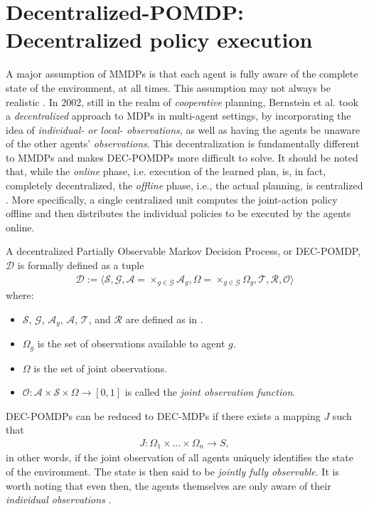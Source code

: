 \section{Decentralized-POMDP: Decentralized policy execution}
\label{sec:decpomdp}
A major assumption of MMDPs is that each agent is fully aware of the complete state of the environment, at all times. This assumption may not always be realistic \cite{decmdp}. In 2002, still in the realm of \textit{cooperative} planning, Bernstein et al. \cite{decmdp2} took a \textit{decentralized} approach to MDPs in multi-agent settings, by incorporating the idea of \textit{individual- or local- observations}, as well as having the agents be unaware of the other agents' \textit{observations}. This decentralization is fundamentally different to MMDPs and makes DEC-POMDPs more difficult to solve. It should be noted that, while the \textit{online} phase, i.e. execution of the learned plan, is, in fact, completely decentralized, the \textit{offline} phase, i.e., the actual planning, is centralized \cite{moredec}. More specifically, a single centralized unit computes the joint-action policy offline and then distributes the individual policies to be executed by the agents online.

\begin{definition}
\label{def:decpomdp}
A decentralized Partially Observable Markov Decision Process, or DEC-POMDP, $\mathcal{D}$ is formally defined as a tuple
\begin{align*}
    \mathcal{D} := \big \langle \mathcal{S}, \mathcal{G}, \mathcal{A} = \times_{g \in \mathcal{G}} \mathcal{A}_g, \Omega = \times_{g \in \mathcal{G}} \Omega_g, \mathcal{T}, \mathcal{R}, \mathcal{O} \big \rangle
  \end{align*}
where:
\begin{itemize}
    \item $\mathcal{S}$, $\mathcal{G}$, $\mathcal{A}_g$, $\mathcal{A}$, $\mathcal{T}$, and $\mathcal{R}$ are defined as in .
    \item $\Omega_g$ is the set of observations available to agent $g$.
    \item $\Omega$ is the set of joint observations.
    \item $\mathcal{O} : \mathcal{A} \times \mathcal{S} \times \Omega \rightarrow [0,1]$ is called the \textit{joint observation function}.
\end{itemize}
\end{definition}
DEC-POMDPs can be reduced to DEC-MDPs if there exists a mapping $J$ such that
\begin{align}
    J: \Omega_1 \times ... \times \Omega_n \rightarrow S,
\end{align}
in other words, if the joint observation of all agents uniquely identifies the state of the environment. The state is then said to be \textit{jointly fully observable}. It is worth noting that even then, the agents themselves are only aware of their \textit{individual observations} \cite{oliehoek}.

